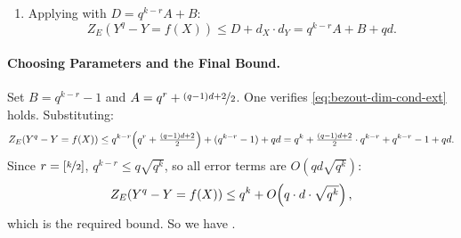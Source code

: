 \begin{enumerate}[label=(\roman*),resume]
  \item Applying \WeightedBezoutlem with $D=q^{k-r}A+B$:
$$Z_E(Y^q-Y=f(X))\leq D+d_X\cdot d_Y=q^{k-r}A+B+qd.$$
\end{enumerate}

\paragraph*{Choosing Parameters and the Final Bound.}
Set $B=q^{k-r}-1$ and $A=q^r+\nicefrac{(q-1)d+2}{2}$. One verifies \eqref{eq:bezout-dim-cond-ext} holds. Substituting:
$$Z_E(Y^q-Y=f(X))\leq q^{k-r}\!\left(q^r+\tfrac{(q-1)d+2}{2}\right)+(q^{k-r}-1)+qd=q^k+\tfrac{(q-1)d+2}{2}\cdot q^{k-r}+q^{k-r}-1+qd.$$
Since $r=\left[\nicefrac{k}{2}\right]$, $q^{k-r}\leq q\sqrt{q^k}$, so all error terms are $O(qd\sqrt{q^k})$:
$$Z_E(Y^q-Y=f(X))\leq q^k+O\!\left(q\cdot d\cdot\sqrt{q^k}\right),$$
which is the required bound. So we have \BombieriBezoutExtthm.

